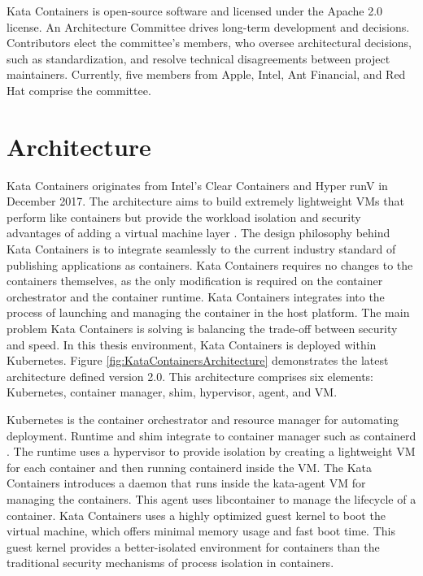 Kata Containers is open-source software and licensed under the Apache 2.0 license. An Architecture Committee drives long-term development and decisions. Contributors elect the committee's members, who oversee architectural decisions, such as standardization, and resolve technical disagreements between project maintainers. Currently, five members from Apple, Intel, Ant Financial, and Red Hat comprise the committee. \cite{KataContainersGovernance}\cite{KataContainers}

\section{Architecture}

Kata Containers originates from Intel's Clear Containers \cite{ClearContainers} and Hyper runV \cite{runV} in December 2017. The architecture aims to build extremely lightweight VMs that perform like containers but provide the workload isolation and security advantages of adding a virtual machine layer \cite{Randazzo2019}. The design philosophy behind Kata Containers is to integrate seamlessly to the current industry standard of publishing applications as containers. Kata Containers requires no changes to the containers themselves, as the only modification is required on the container orchestrator and the container runtime. Kata Containers integrates into the process of launching and managing the container in the host platform. The main problem Kata Containers is solving is balancing the trade-off between security and speed. In this thesis environment, Kata Containers is deployed within Kubernetes. Figure \ref{fig:KataContainersArchitecture} demonstrates the latest architecture defined version 2.0. This architecture comprises six elements: Kubernetes, container manager, shim, hypervisor, agent, and VM. 

Kubernetes is the container orchestrator and resource manager for automating deployment. Runtime and shim integrate to container manager such as containerd \cite{containerd}. The runtime uses a hypervisor to provide isolation by creating a lightweight VM for each container and then running containerd inside the VM. The Kata Containers introduces a daemon that runs inside the kata-agent VM for managing the containers. This agent uses libcontainer to manage the lifecycle of a container. Kata Containers uses a highly optimized guest kernel to boot the virtual machine, which offers minimal memory usage and fast boot time. This guest kernel provides a better-isolated environment for containers than the traditional security mechanisms of process isolation in containers. \cite{Kumar2020}


